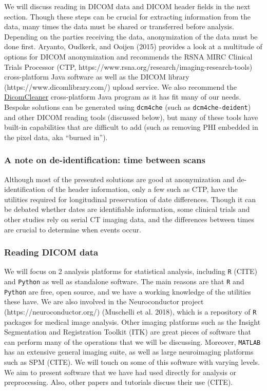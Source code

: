 \documentclass[]{elsarticle} %
\begin{document}
We will discuss reading in DICOM data and DICOM header fields in the
next section. Though these steps can be crucial for extracting
information from the data, many times the data must be shared or
transferred before analysis. Depending on the parties receiving the
data, anonymization of the data must be done first. Aryanto, Oudkerk,
and Ooijen (2015) provides a look at a multitude of options for DICOM
anonymization and recommends the RSNA MIRC Clinical Trials Processor
(CTP, https://www.rsna.org/research/imaging-research-tools)
cross-platform Java software as well as the DICOM library
(https://www.dicomlibrary.com/) upload service. We also recommend the
\href{https://www.dclunie.com/pixelmed/software/webstart/DicomCleanerUsage.html}{DicomCleaner}
cross-platform Java program as it has fit many of our needs. Bespoke
solutions can be generated using \texttt{dcm4che} (such as
\texttt{dcm4che-deident}) and other DICOM reading tools (discussed
below), but many of these tools have built-in capabilities that are
difficult to add (such as removing PHI embedded in the pixel data, aka
``burned in'').

\hypertarget{a-note-on-de-identification-time-between-scans}{%
\subsubsection{A note on de-identification: time between
scans}\label{a-note-on-de-identification-time-between-scans}}

Although most of the presented solutions are good at anonymization and
de-identification of the header information, only a few such as CTP,
have the utilities required for longitudinal preservation of date
differences. Though it can be debated whether dates are identifiable
information, some clinical trials and other studies rely on serial CT
imaging data, and the differences between times are crucial to determine
when events occur.

\hypertarget{reading-dicom-data}{%
\subsubsection{Reading DICOM data}\label{reading-dicom-data}}

We will focus on 2 analysis platforms for statistical analysis,
including \texttt{R} (CITE) and \texttt{Python} as well as standalone
software. The main reasons are that \texttt{R} and \texttt{Python} are
free, open source, and we have a working knowledge of the utilities
these have. We are also involved in the Neuroconductor project
(https://neuroconductor.org/) (Muschelli et al. 2018), which is a
repository of \texttt{R} packages for medical image analysis. Other
imaging platforms such as the Insight Segmentation and Registration
Toolkit (ITK) are great pieces of software that can perform many of the
operations that we will be discussing. Moreover, \texttt{MATLAB} has an
extensive general imaging suite, as well as large neuroimaging platforms
such as SPM (CITE). We will touch on some of this software with varying
levels. We aim to present software that we have had used directly for
analysis or preprocessing. Also, other papers and tutorials discuss
their use (CITE).
\end{document}
